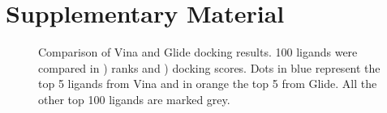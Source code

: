 \documentclass[11pt, letterpaper, titlepage]{article}
\begin{document}
\pagebreak
\section{Supplementary Material}

\setcounter{figure}{0}
\renewcommand{\thefigure}{S\arabic{figure}}
\setcounter{table}{0}
\renewcommand{\thetable}{S\arabic{table}}

\begin{figure}[htp]
	\centering
	\captionsetup[subfigure]{skip=-15pt,position=top,labelfont=bf,labelformat=parens,singlelinecheck=false}
	\caption{Comparison of Vina and Glide docking results. 100 ligands were compared in ) ranks and ) docking scores. Dots in blue represent the top 5 ligands from Vina and in orange the top 5 from Glide. All the other top 100 ligands are marked grey.}\label{fig:comp_glide_vina}
\end{figure}
\end{document}
